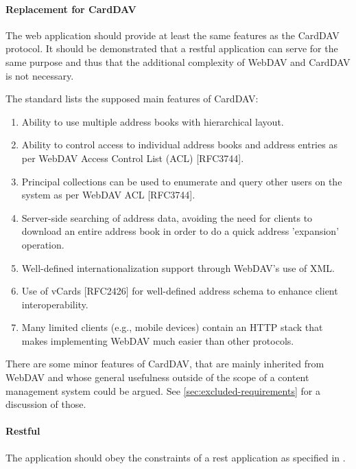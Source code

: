 \documentclass[12pt,a4paper]{scrartcl}		%
\begin{document}

\paragraph{Replacement for CardDAV}

The web application should provide at least the same features as the CardDAV
protocol. It should be demonstrated that a restful application can serve for the
same purpose and thus that the additional complexity of WebDAV and CardDAV is
not necessary.

The standard lists the supposed main features of CardDAV\cite[sec. 1]{RFC6352}:

\begin{enumerate}
\item Ability to use multiple address books with hierarchical layout.
\item Ability to control access to individual address books and address entries
  as per WebDAV Access Control List (ACL) [RFC3744].
\item Principal collections can be used to enumerate and query other users on
  the system as per WebDAV ACL [RFC3744].
\item Server-side searching of address data, avoiding the need for clients to
  download an entire address book in order to do a quick address 'expansion'
  operation.
\item Well-defined internationalization support through WebDAV's use of XML.
\item Use of vCards [RFC2426] for well-defined address schema to enhance client
  interoperability.
\item Many limited clients (e.g., mobile devices) contain an HTTP stack that
  makes implementing WebDAV much easier than other protocols.
\end{enumerate}

There are some minor features of CardDAV, that are mainly inherited from WebDAV
and whose general usefulness outside of the scope of a content management system
could be argued. See \autoref{sec:excluded-requirements} for a discussion of
those.

\paragraph{Restful}
The application should obey the constraints of a rest application as specified
in \cite{Fielding2000}.
\end{document}
